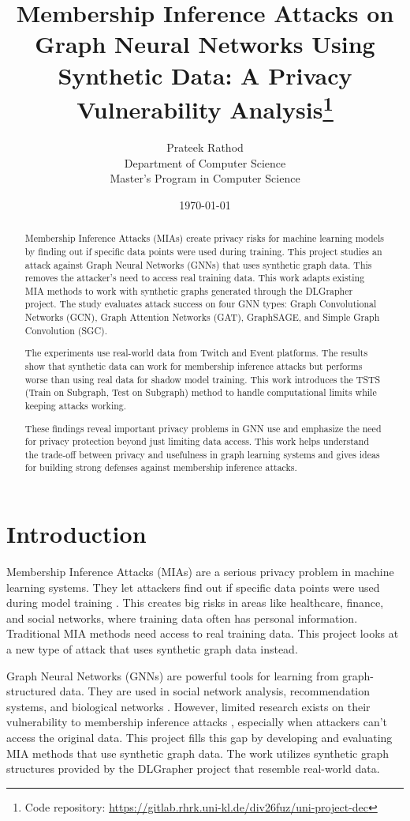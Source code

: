 \documentclass{article}
\title{Membership Inference Attacks on Graph Neural Networks Using Synthetic Data: A Privacy Vulnerability Analysis\footnote{Code repository: \url{https://gitlab.rhrk.uni-kl.de/div26fuz/uni-project-dec}}}
\author{Prateek Rathod\\
Department of Computer Science\\
Master's Program in Computer Science}
\date{\today}
\begin{document}
\maketitle

\begin{abstract}
Membership Inference Attacks (MIAs) create privacy risks for machine learning models by finding out if specific data points were used during training. This project studies an attack against Graph Neural Networks (GNNs) that uses synthetic graph data. This removes the attacker's need to access real training data. This work adapts existing MIA methods to work with synthetic graphs generated through the DLGrapher project\cite{dlgrapher2022}. The study evaluates attack success on four GNN types: Graph Convolutional Networks (GCN), Graph Attention Networks (GAT), GraphSAGE, and Simple Graph Convolution (SGC). 

The experiments use real-world data from Twitch and Event platforms. The results show that synthetic data can work for membership inference attacks but performs worse than using real data for shadow model training. This work introduces the TSTS (Train on Subgraph, Test on Subgraph) method to handle computational limits while keeping attacks working. 

These findings reveal important privacy problems in GNN use and emphasize the need for privacy protection beyond just limiting data access. This work helps understand the trade-off between privacy and usefulness in graph learning systems and gives ideas for building strong defenses against membership inference attacks.
\end{abstract}

\tableofcontents
\newpage

\section{Introduction}
Membership Inference Attacks (MIAs) are a serious privacy problem in machine learning systems. They let attackers find out if specific data points were used during model training \cite{shokri2017membership}. This creates big risks in areas like healthcare, finance, and social networks, where training data often has personal information. Traditional MIA methods need access to real training data. This project looks at a new type of attack that uses synthetic graph data instead.

Graph Neural Networks (GNNs) are powerful tools for learning from graph-structured data. They are used in social network analysis, recommendation systems, and biological networks \cite{kipf2017semi, velickovic2018graph, hamilton2017inductive}. However, limited research exists on their vulnerability to membership inference attacks \cite{he2021membership}, especially when attackers can't access the original data. This project fills this gap by developing and evaluating MIA methods that use synthetic graph data. The work utilizes synthetic graph structures provided by the DLGrapher project \cite{dlgrapher2022} that resemble real-world data.
\end{document}
